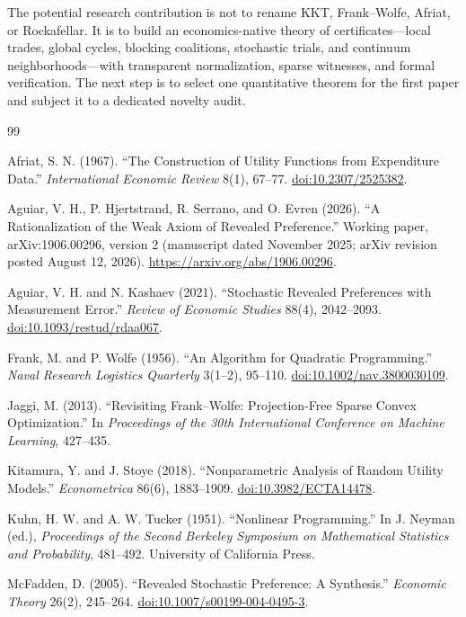 \documentclass[11pt]{article}
\theoremstyle{definition}
\theoremstyle{remark}
\begin{document}
The potential research contribution is not to rename KKT, Frank--Wolfe, Afriat, or Rockafellar.
It is to build an economics-native theory of certificates---local trades, global cycles, blocking
coalitions, stochastic trials, and continuum neighborhoods---with transparent normalization,
sparse witnesses, and formal verification.  The next step is to select one quantitative theorem
for the first paper and subject it to a dedicated novelty audit.

\begin{thebibliography}{99}

Afriat, S. N. (1967).
``The Construction of Utility Functions from Expenditure Data.''
\emph{International Economic Review} 8(1), 67--77.
\href{https://doi.org/10.2307/2525382}{doi:10.2307/2525382}.

Aguiar, V. H., P. Hjertstrand, R. Serrano, and O. Evren (2026).
``A Rationalization of the Weak Axiom of Revealed Preference.''
Working paper, arXiv:1906.00296, version 2 (manuscript dated November 2025;
arXiv revision posted August 12, 2026).
\url{https://arxiv.org/abs/1906.00296}.

Aguiar, V. H. and N. Kashaev (2021).
``Stochastic Revealed Preferences with Measurement Error.''
\emph{Review of Economic Studies} 88(4), 2042--2093.
\href{https://doi.org/10.1093/restud/rdaa067}{doi:10.1093/restud/rdaa067}.

Frank, M. and P. Wolfe (1956).
``An Algorithm for Quadratic Programming.''
\emph{Naval Research Logistics Quarterly} 3(1--2), 95--110.
\href{https://doi.org/10.1002/nav.3800030109}{doi:10.1002/nav.3800030109}.

Jaggi, M. (2013).
``Revisiting Frank--Wolfe: Projection-Free Sparse Convex Optimization.''
In \emph{Proceedings of the 30th International Conference on Machine Learning}, 427--435.

Kitamura, Y. and J. Stoye (2018).
``Nonparametric Analysis of Random Utility Models.''
\emph{Econometrica} 86(6), 1883--1909.
\href{https://doi.org/10.3982/ECTA14478}{doi:10.3982/ECTA14478}.

Kuhn, H. W. and A. W. Tucker (1951).
``Nonlinear Programming.''
In J. Neyman (ed.), \emph{Proceedings of the Second Berkeley Symposium on Mathematical
Statistics and Probability}, 481--492. University of California Press.

McFadden, D. (2005).
``Revealed Stochastic Preference: A Synthesis.''
\emph{Economic Theory} 26(2), 245--264.
\href{https://doi.org/10.1007/s00199-004-0495-3}{doi:10.1007/s00199-004-0495-3}.


\end{thebibliography}
\end{document}
